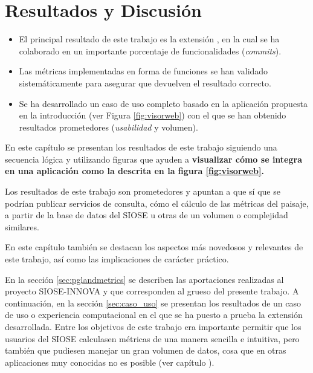 \chapter{Resultados y Discusión}\label{chap:result}

\begin{graybox}
\begin{itemize}
\item El principal resultado de este trabajo es la extensión \pgland{}, en la cual se ha colaborado en un importante porcentaje de funcionalidades (\textit{commits}).
\item Las métricas implementadas en forma de funciones se han validado sistemáticamente para asegurar que devuelven el resultado correcto.
\item Se ha desarrollado un caso de uso completo basado en la aplicación propuesta en la introducción (ver Figura \ref{fig:visorweb}) con el que se han obtenido resultados prometedores (\textit{usabilidad} y volumen).
\end{itemize}
\end{graybox}


En este capítulo se presentan los resultados de este trabajo siguiendo una secuencia lógica y utilizando  figuras que ayuden a \textbf{visualizar cómo \pgland{} se integra en una aplicación como la descrita en la figura \ref{fig:visorweb}.}

Los resultados de este trabajo son prometedores y apuntan a que sí que se podrían publicar servicios de consulta, cómo el cálculo de las métricas del paisaje, a partir de la base de datos del SIOSE u otras de un volumen o complejidad similares.

En este capítulo también se destacan los  aspectos más novedosos y relevantes de este trabajo, así como las implicaciones de carácter práctico.

En la sección \ref{sec:pglandmetrics} se describen las aportaciones realizadas al proyecto SIOSE-INNOVA y que corresponden al grueso del presente trabajo. A continuación, en la sección \ref{sec:caso_uso} se presentan los resultados de un caso de uso o experiencia computacional en el que se ha puesto a prueba la extensión desarrollada. Entre los objetivos de este trabajo era importante permitir que los usuarios del SIOSE calculasen métricas de una manera sencilla e intuitiva, pero también que pudiesen manejar un gran volumen de datos, cosa que en otras aplicaciones muy conocidas no es posible (ver capítulo ).


